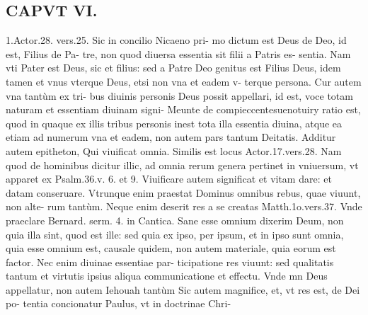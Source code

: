 \documentclass{article}
\begin{document}
\begin{pages}
\section*{CAPVT  VI. }
\marginpar{[ p.469 ]}\pstart 1.Actor.28. vers.25. Sic in concilio Nicaeno pri- mo dictum est Deus de Deo, id est, Filius de Pa- tre, non quod diuersa essentia sit filii a Patris es- sentia. Nam vti Pater est Deus, sic et filius: sed a Patre Deo genitus est Filius Deus, idem tamen et vnus vterque Deus, etsi non vna et eadem v- terque persona. Cur autem vna tantùm ex tri- bus diuinis personis Deus possit appellari, id est, voce totam naturam et essentiam diuinam signi- Meunte de compieccentesuenotuiry ratio est, quod in quaque ex illis tribus personis inest tota illa essentia diuina, atque ea etiam ad numerum vna et eadem, non autem pars tantum Deitatis.  \pend\pstart Additur autem epitheton, Qui viuificat omnia. Similis est locus Actor.17.vers.28. Nam quod de hominibus dicitur illic, ad omnia rerum genera pertinet in vniuersum, vt apparet ex Psalm.36.v. 6. et 9. Viuificare autem significat et vitam dare: et datam conseruare. Vtrunque enim praestat Dominus omnibus rebus, quae viuunt, non alte- rum tantùm. Neque enim deserit res a se creatas Matth.1o.vers.37. Vnde praeclare Bernard. serm. 4. in Cantica. Sane esse omnium dixerim Deum, non quia illa sint, quod est ille: sed quia ex ipso, per ipsum, et in ipso sunt omnia, quia esse omnium est, causale quidem, non autem materiale, quia eorum est factor. Nec enim diuinae essentiae par- ticipatione res viuunt: sed qualitatis tantum et virtutis ipsius aliqua communicatione et effectu. Vnde mn Deus appellatur, non autem Iehouah tantùm  \pend\pstart Sic autem magnifice, et, vt res est, de Dei po- tentia concionatur Paulus, vt in doctrinae Chri-  \pend

\end{pages}
\end{document}

